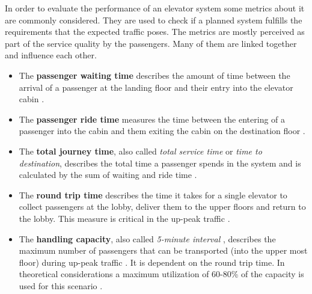 In order to evaluate the performance of an elevator system some metrics about it are commonly considered.
They are used to check if a planned system fulfills the requirements that the expected traffic poses. 
The metrics are mostly perceived as part of the service quality by the passengers.
Many of them are linked together and influence each other.


\begin{itemize}

    \item The \textbf{passenger waiting time} 
        describes the amount of time between the arrival of a passenger at the landing floor 
        and their entry into the elevator cabin 
        \autocite[][p.~7]{hakonen2003simulation}\autocite[][pp.8-9]{siikonen1997models}.
        
    \item The \textbf{passenger ride time} 
        measures the time between the entering of a passenger into the cabin 
        and them exiting the cabin on the destination floor
    \autocite[][pp.8-9]{siikonen1997models}.
    
    \item The \textbf{total journey time}, 
        also called \emph{total service time} \autocite[][p.~10]{beers2015arrivals} or \emph{time to destination},
        describes the total time a passenger spends in the system 
        and is calculated by the sum of waiting and ride time
        \autocite[][pp.8-9]{siikonen1997models}.
        
    \item The \textbf{round trip time} 
        describes the time it takes for a single elevator to collect passengers at the lobby,
        deliver them to the upper floors and return to the lobby. 
        This measure is critical in the up-peak traffic
        \autocite[][pp.8-9]{siikonen1997models}.
        
    \item The \textbf{handling capacity}, 
        also called \emph{5-minute interval}
        \autocite[][p.~194]{unger2015aufzuege},
        describes the maximum number of passengers that can be transported (into the upper most floor) during up-peak traffic
        \autocite[][pp.8-9]{siikonen1997models}.
        It is dependent on the round trip time.
        In theoretical considerations a maximum utilization of 60-80\% of the capacity is used for this scenario
        \autocite[][p.~194]{unger2015aufzuege}\autocite[][p.~7]{hakonen2003simulation}.
    

\end{itemize}
